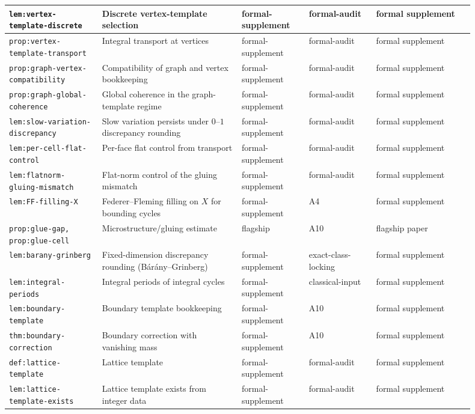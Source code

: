 \documentclass[11pt]{article}
\numberwithin{equation}{section}  %
\theoremstyle{plain}
\theoremstyle{definition}
\theoremstyle{remark}
\begin{document}
\begin{longtable}{|p{0.18\linewidth}|p{0.27\linewidth}|p{0.13\linewidth}|p{0.13\linewidth}|p{0.19\linewidth}|}
\texttt{lem:vertex-template-discrete} & Discrete vertex-template selection & formal-supplement & formal-audit & formal supplement \\ \hline
\texttt{prop:vertex-template-transport} & Integral transport at vertices & formal-supplement & formal-audit & formal supplement \\ \hline
\texttt{prop:graph-vertex-compatibility} & Compatibility of graph and vertex bookkeeping & formal-supplement & formal-audit & formal supplement \\ \hline
\texttt{prop:graph-global-coherence} & Global coherence in the graph-template regime & formal-supplement & formal-audit & formal supplement \\ \hline
\texttt{lem:slow-variation-discrepancy} & Slow variation persists under $0$--$1$ discrepancy rounding & formal-supplement & formal-audit & formal supplement \\ \hline
\texttt{lem:per-cell-flat-control} & Per-face flat control from transport & formal-supplement & formal-audit & formal supplement \\ \hline
\texttt{lem:flatnorm-gluing-mismatch} & Flat-norm control of the gluing mismatch & formal-supplement & formal-audit & formal supplement \\ \hline
\texttt{lem:FF-filling-X} & Federer--Fleming filling on $X$ for bounding cycles & formal-supplement & A4 & formal supplement \\ \hline
\texttt{prop:glue-gap, prop:glue-cell} & Microstructure/gluing estimate & flagship & A10 & flagship paper \\ \hline
\texttt{lem:barany-grinberg} & Fixed-dimension discrepancy rounding (B\'ar\'any--Grinberg) & formal-supplement & exact-class-locking & formal supplement \\ \hline
\texttt{lem:integral-periods} & Integral periods of integral cycles & formal-supplement & classical-input & formal supplement \\ \hline
\texttt{lem:boundary-template} & Boundary template bookkeeping & formal-supplement & A10 & formal supplement \\ \hline
\texttt{thm:boundary-correction} & Boundary correction with vanishing mass & formal-supplement & A10 & formal supplement \\ \hline
\texttt{def:lattice-template} & Lattice template & formal-supplement & formal-audit & formal supplement \\ \hline
\texttt{lem:lattice-template-exists} & Lattice template exists from integer data & formal-supplement & formal-audit & formal supplement \\ \hline

\end{longtable}
\end{document}
